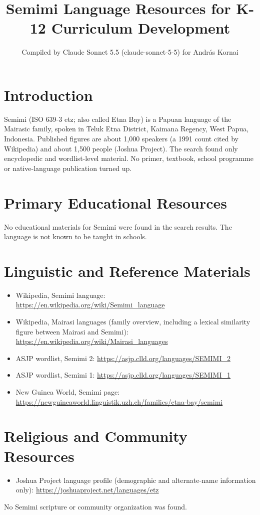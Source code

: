 \documentclass[12pt]{article}
\title{Semimi Language Resources for K-12 Curriculum Development}
\author{Compiled by Claude Sonnet 5.5 (claude-sonnet-5-5) for Andr\'as Kornai}
\date{}
\begin{document}
\maketitle

\section{Introduction}
Semimi (ISO 639-3 etz; also called Etna Bay) is a Papuan language of the Mairasic family, spoken in Teluk Etna District, Kaimana Regency, West Papua, Indonesia. Published figures are about 1,000 speakers (a 1991 count cited by Wikipedia) and about 1,500 people (Joshua Project). The search found only encyclopedic and wordlist-level material. No primer, textbook, school programme or native-language publication turned up.

\section{Primary Educational Resources}
No educational materials for Semimi were found in the search results. The language is not known to be taught in schools.

\section{Linguistic and Reference Materials}
\begin{itemize}
\item Wikipedia, Semimi language: \url{https://en.wikipedia.org/wiki/Semimi_language}
\item Wikipedia, Mairasi languages (family overview, including a lexical similarity figure between Mairasi and Semimi): \url{https://en.wikipedia.org/wiki/Mairasi_languages}
\item ASJP wordlist, Semimi 2: \url{https://asjp.clld.org/languages/SEMIMI_2}
\item ASJP wordlist, Semimi 1: \url{https://asjp.clld.org/languages/SEMIMI_1}
\item New Guinea World, Semimi page: \url{https://newguineaworld.linguistik.uzh.ch/families/etna-bay/semimi}
\end{itemize}

\section{Religious and Community Resources}
\begin{itemize}
\item Joshua Project language profile (demographic and alternate-name information only): \url{https://joshuaproject.net/languages/etz}
\end{itemize}
No Semimi scripture or community organization was found.
\end{document}
